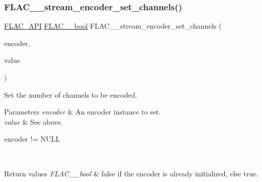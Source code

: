 \subsubsection{\texorpdfstring{F\+L\+A\+C\+\_\+\+\_\+stream\+\_\+encoder\+\_\+set\+\_\+channels()}{FLAC\_\_stream\_encoder\_set\_channels()}}
{\footnotesize\ttfamily \hyperlink{group__flac__export_ga56ca07df8a23310707732b1c0007d6f5}{F\+L\+A\+C\+\_\+\+A\+PI} \hyperlink{ordinals_8h_a95103469f1cbd78b8cf250194985b34e}{F\+L\+A\+C\+\_\+\+\_\+bool} F\+L\+A\+C\+\_\+\+\_\+stream\+\_\+encoder\+\_\+set\+\_\+channels (\begin{DoxyParamCaption}\item[{\hyperlink{struct_f_l_a_c_____stream_encoder}{F\+L\+A\+C\+\_\+\+\_\+\+Stream\+Encoder} $\ast$}]{encoder,  }\item[{unsigned}]{value }\end{DoxyParamCaption})}

Set the number of channels to be encoded.

{} 
\begin{DoxyParams}{Parameters}
{\em encoder} & An encoder instance to set. \\
\hline
{\em value} & See above.  
\begin{DoxyCode}
encoder != NULL 
\end{DoxyCode}
 \\
\hline
\end{DoxyParams}

\begin{DoxyRetVals}{Return values}
{\em F\+L\+A\+C\+\_\+\+\_\+bool} & {\ttfamily false} if the encoder is already initialized, else {\ttfamily true}. \\
\hline
\end{DoxyRetVals}
\mbox{\label{group__flac__stream__encoder_ga03495bcd0aae71116c701b0dcf311c4b}} 

